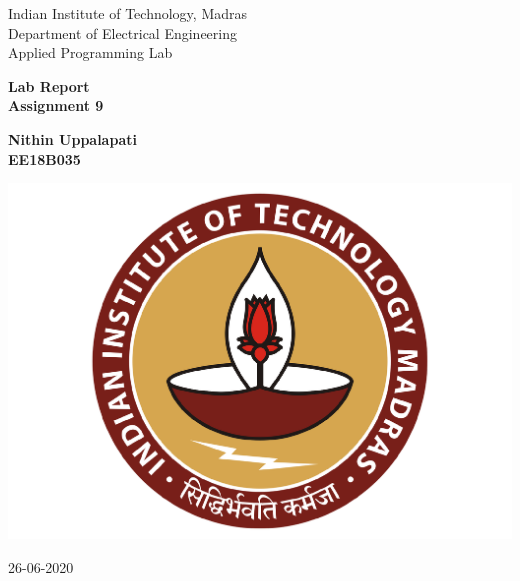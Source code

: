 \documentclass[10pt,english, openany]{book}
\begin{document}

\begin{titlepage}
	\clearpage\thispagestyle{empty}
	\centering
	\vspace{1cm}

	{\Large Indian Institute of Technology, Madras \\ 
		Department of Electrical Engineering \\
		Applied Programming Lab \par}
		\vspace{3cm}
	{\LARGE \textbf{Lab Report}} \\
    \LARGE \textbf{Assignment 9} \\
	\vspace{3cm}
	{\large \textbf{Nithin Uppalapati} \\ 
     \large \textbf{EE18B035} \\%
	\vspace{2cm}
    
    \centering \includegraphics[scale=0.2]{IITm.pdf}
%     
    \vspace{1.5cm}
		
	{\normalsize 26-06-2020 \par}
	
	\pagebreak
}
\end{titlepage}

\tableofcontents{}
\end{document}
